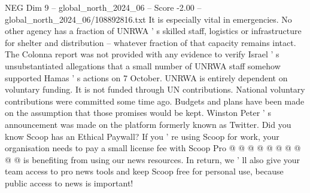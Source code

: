 \begin{textsample}{NEG Dim 9 – global\_north\_2024\_06 – Score -2.00 – global\_north\_2024\_06/108892816.txt}
It is especially vital in emergencies.
No other agency has a fraction of UNRWA ' s skilled staff, logistics or infrastructure for shelter and distribution -- whatever fraction of that capacity remains intact.
The Colonna report was not provided with any evidence to verify Israel ' s unsubstantiated allegations that a small number of UNRWA staff somehow supported Hamas ' s actions on 7 October.
UNRWA is entirely dependent on voluntary funding.
It is not funded through UN contributions.
National voluntary contributions were committed some time ago.
Budgets and plans have been made on the assumption that those promises would be kept.
Winston Peter ' s announcement was made on the platform formerly known as Twitter.
Did you know Scoop has an Ethical Paywall?
If you ' re using Scoop for work, your organisation needs to pay a small license fee with Scoop Pro @ @ @ @ @ @ @ @ @ @ is benefiting from using our news resources.
In return, we ' ll also give your team access to pro news tools and keep Scoop free for personal use, because public access to news is important!

\end{textsample}
